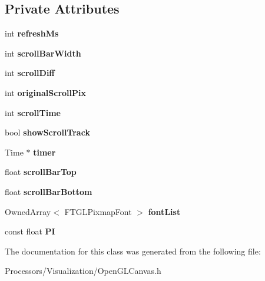 \subsection*{Private Attributes}
\begin{DoxyCompactItemize}
\item 
\hypertarget{classOpenGLCanvas_a909b27627ae036d62b60ab63a543b330}{int {\bfseries refresh\-Ms}}\label{classOpenGLCanvas_a909b27627ae036d62b60ab63a543b330}

\item 
\hypertarget{classOpenGLCanvas_a6293f4a62ec535fa57f371481c9df4dd}{int {\bfseries scroll\-Bar\-Width}}\label{classOpenGLCanvas_a6293f4a62ec535fa57f371481c9df4dd}

\item 
\hypertarget{classOpenGLCanvas_a0ada22b76e338a5bfbd30f701098d012}{int {\bfseries scroll\-Diff}}\label{classOpenGLCanvas_a0ada22b76e338a5bfbd30f701098d012}

\item 
\hypertarget{classOpenGLCanvas_a5e8dc9683a6903282827f51d762d077a}{int {\bfseries original\-Scroll\-Pix}}\label{classOpenGLCanvas_a5e8dc9683a6903282827f51d762d077a}

\item 
\hypertarget{classOpenGLCanvas_a275e1d0b1c3e6d96307c7fd836866a61}{int {\bfseries scroll\-Time}}\label{classOpenGLCanvas_a275e1d0b1c3e6d96307c7fd836866a61}

\item 
\hypertarget{classOpenGLCanvas_a5dd720a68dd006d4659048dce18b142e}{bool {\bfseries show\-Scroll\-Track}}\label{classOpenGLCanvas_a5dd720a68dd006d4659048dce18b142e}

\item 
\hypertarget{classOpenGLCanvas_a20554e3f03d0684e098d81ea32c48546}{Time $\ast$ {\bfseries timer}}\label{classOpenGLCanvas_a20554e3f03d0684e098d81ea32c48546}

\item 
\hypertarget{classOpenGLCanvas_aec887b0202c094a8aa5407148ba952c3}{float {\bfseries scroll\-Bar\-Top}}\label{classOpenGLCanvas_aec887b0202c094a8aa5407148ba952c3}

\item 
\hypertarget{classOpenGLCanvas_a4efba8234e1e3f49889ca6d07985b1c2}{float {\bfseries scroll\-Bar\-Bottom}}\label{classOpenGLCanvas_a4efba8234e1e3f49889ca6d07985b1c2}

\item 
\hypertarget{classOpenGLCanvas_ac632b87dc48d1f446d94ebfced6f5dc0}{Owned\-Array$<$ F\-T\-G\-L\-Pixmap\-Font $>$ {\bfseries font\-List}}\label{classOpenGLCanvas_ac632b87dc48d1f446d94ebfced6f5dc0}

\item 
\hypertarget{classOpenGLCanvas_ac48e05ebd99775d76c5dc4c6838dfe04}{const float {\bfseries P\-I}}\label{classOpenGLCanvas_ac48e05ebd99775d76c5dc4c6838dfe04}

\end{DoxyCompactItemize}


The documentation for this class was generated from the following file\-:\begin{DoxyCompactItemize}
\item 
Processors/\-Visualization/Open\-G\-L\-Canvas.\-h\end{DoxyCompactItemize}
